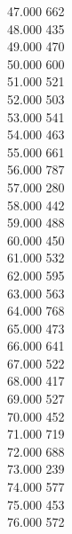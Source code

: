 { 47.000	662 \\
 48.000	435 \\
 49.000	470 \\
 50.000	600 \\
 51.000	521 \\
 52.000	503 \\
 53.000	541 \\
 54.000	463 \\
 55.000	661 \\
 56.000	787 \\
 57.000	280 \\
 58.000	442 \\
 59.000	488 \\
 60.000	450 \\
 61.000	532 \\
 62.000	595 \\
 63.000	563 \\
 64.000	768 \\
 65.000	473 \\
 66.000	641 \\
 67.000	522 \\
 68.000	417 \\
 69.000	527 \\
 70.000	452 \\
 71.000	719 \\
 72.000	688 \\
 73.000	239 \\
 74.000	577 \\
 75.000	453 \\
 76.000	572 \\
}
